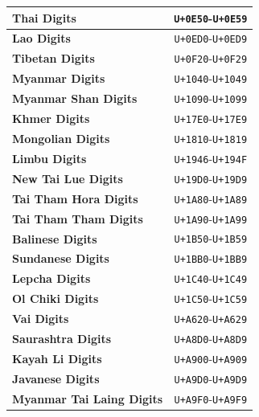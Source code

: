 \documentclass [10pt]{article}
\begin{document}
\begin{center}
\begin{longtable}{|l|c|}
  	\textbf{Thai Digits}                         &  \texttt{U+0E50}-\texttt{U+0E59}  \\ \hline
  	\textbf{Lao Digits}                          &  \texttt{U+0ED0}-\texttt{U+0ED9}  \\ \hline
  	\textbf{Tibetan Digits}                      &  \texttt{U+0F20}-\texttt{U+0F29}  \\ \hline
  	\textbf{Myanmar Digits}                      &  \texttt{U+1040}-\texttt{U+1049}  \\ \hline
  	\textbf{Myanmar Shan Digits}                 &  \texttt{U+1090}-\texttt{U+1099}  \\ \hline
  	\textbf{Khmer Digits}                        &  \texttt{U+17E0}-\texttt{U+17E9}  \\ \hline
  	\textbf{Mongolian Digits}                    &  \texttt{U+1810}-\texttt{U+1819}  \\ \hline
  	\textbf{Limbu Digits}                        &  \texttt{U+1946}-\texttt{U+194F}  \\ \hline
  	\textbf{New Tai Lue Digits}                  &  \texttt{U+19D0}-\texttt{U+19D9}  \\ \hline
  	\textbf{Tai Tham Hora Digits}                &  \texttt{U+1A80}-\texttt{U+1A89}  \\ \hline
  	\textbf{Tai Tham Tham Digits}                &  \texttt{U+1A90}-\texttt{U+1A99}  \\ \hline
  	\textbf{Balinese Digits}                     &  \texttt{U+1B50}-\texttt{U+1B59}  \\ \hline
  	\textbf{Sundanese Digits}                    &  \texttt{U+1BB0}-\texttt{U+1BB9}  \\ \hline
  	\textbf{Lepcha Digits}                       &  \texttt{U+1C40}-\texttt{U+1C49}  \\ \hline
  	\textbf{Ol Chiki Digits}                     &  \texttt{U+1C50}-\texttt{U+1C59}  \\ \hline
  	\textbf{Vai Digits}                          &  \texttt{U+A620}-\texttt{U+A629}  \\ \hline
  	\textbf{Saurashtra Digits}                   &  \texttt{U+A8D0}-\texttt{U+A8D9}  \\ \hline
  	\textbf{Kayah Li Digits}                     &  \texttt{U+A900}-\texttt{U+A909}  \\ \hline
  	\textbf{Javanese Digits}                     &  \texttt{U+A9D0}-\texttt{U+A9D9}  \\ \hline
  	\textbf{Myanmar Tai Laing Digits}            &  \texttt{U+A9F0}-\texttt{U+A9F9}  \\ \hline

\end{longtable}
\end{center}
\end{document}
